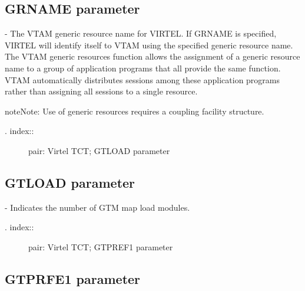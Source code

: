 \documentclass[letterpaper,10pt,english]{sphinxmanual}
\begin{document}
\subsection{GRNAME parameter}
\label{\detokenize{Installation_Guide:grname-parameter}}
\begin{sphinxVerbatim}[commandchars=\\\{\}]
            
\end{sphinxVerbatim}

 - The VTAM generic resource name for VIRTEL. If GRNAME is specified, VIRTEL will identify itself to VTAM using the specified generic resource name. The VTAM generic resources function allows the assignment of a generic resource name to a group of application programs that all provide the same function. VTAM automatically distributes sessions among these application programs rather than assigning all sessions to a single resource.

\begin{sphinxadmonition}{note}{Note:}
Use of generic resources requires a coupling facility structure.
\end{sphinxadmonition}
\begin{description}
\item[{. index::}] \leavevmode
pair: Virtel TCT; GTLOAD parameter

\end{description}


\subsection{GTLOAD parameter}
\label{\detokenize{Installation_Guide:gtload-parameter}}
\begin{sphinxVerbatim}[commandchars=\\\{\}]
                
\end{sphinxVerbatim}

 - Indicates the number of GTM map load modules.
\begin{description}
\item[{. index::}] \leavevmode
pair: Virtel TCT; GTPREF1 parameter

\end{description}


\subsection{GTPRFE1 parameter}
\label{\detokenize{Installation_Guide:gtprfe1-parameter}}
\begin{sphinxVerbatim}[commandchars=\\\{\}]
    
\end{sphinxVerbatim}
\end{document}
